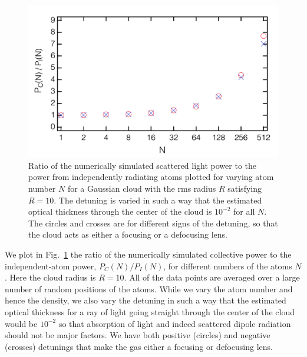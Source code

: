 \begin{figure}[h!]
\begin{center}
\includegraphics[width=\textwidth]{Pc_Pi.pdf}
\end{center}
\caption{Ratio of the numerically simulated scattered light power to the power from independently radiating atoms plotted for varying atom number $N$ for a Gaussian cloud with the rms radius $R$ satisfying $R=10$. The detuning is varied in such a way that the estimated optical thickness through the center of the cloud is $10^{-2}$ for all $N$. The circles and crosses are for different signs of the detuning, so that the cloud acts as either a focusing or a defocusing lens.}
\label{PCANDPN}
\end{figure}



We plot in Fig.~\ref{PCANDPN} the ratio of the numerically simulated collective power to the independent-atom power, $P_C(N)/P_I(N)$, for different numbers of the atoms $N$. Here the cloud radius is $R=10$. All of the data points are averaged over a large number of random positions of the atoms. While we vary the atom number and hence the density, we also vary the detuning in such a way that the estimated optical thickness for a ray of light going straight through the center of the cloud would be $10^{-2}$ so that absorption of light and indeed scattered dipole radiation should not be major factors. We have both positive (circles) and negative (crosses) detunings that make the gas either a focusing or defocusing lens.

